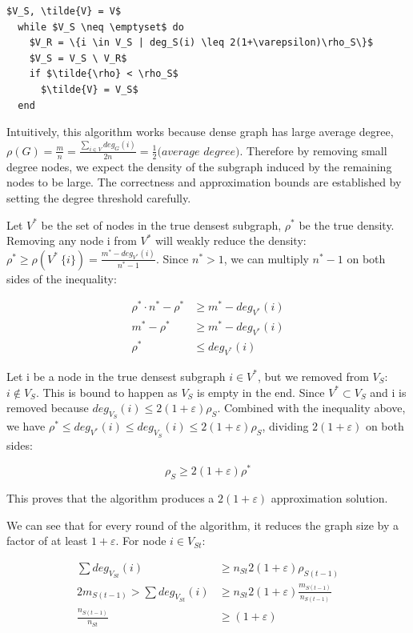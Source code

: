 \documentclass{article}
\begin{document}
\begin{lstlisting}[mathescape=true]
  $V_S, \tilde{V} = V$
  while $V_S \neq \emptyset$ do
    $V_R = \{i \in V_S | deg_S(i) \leq 2(1+\varepsilon)\rho_S\}$
    $V_S = V_S \ V_R$
    if $\tilde{\rho} < \rho_S$
      $\tilde{V} = V_S$
  end
\end{lstlisting}

Intuitively, this algorithm works because dense graph has large average degree, $\rho(G) = \frac{m}{n} = \frac{\sum_{i \in V}{deg_G(i)}}{2n} = \frac{1}{2} \textit{(average degree)}$. Therefore by removing small degree nodes, we expect the density of the subgraph induced by the remaining nodes to be large. The correctness and approximation bounds are established by setting the degree threshold carefully.

Let $V^*$ be the set of nodes in the true densest subgraph, $\rho^*$ be the true density. Removing any node i from $V^*$ will weakly reduce the density: $\rho^* \geq \rho(V^* \ \{i\}) = \frac{m^* - deg_{V^*}(i)}{n^* - 1}$. Since $n^* > 1$, we can multiply $n^* - 1$ on both sides of the inequality:

\begin{equation}
  \begin{split}
    \rho^* \cdot n^* - \rho^* & \geq m^* - deg_{V^*}(i) \\
    m^* - \rho^* & \geq m^* - deg_{V^*}(i) \\
    \rho^* & \leq deg_{V^*}(i)
  \end{split}
\end{equation}

Let i be a node in the true densest subgraph $ i \in V^*$, but we removed from $V_S$: $i \notin V_S$. This is bound to happen as $V_S$ is empty in the end. Since $V^* \subset V_S$ and i is removed because $deg_{V_S}(i) \leq 2(1+\varepsilon)\rho_S$. Combined with the inequality above, we have $\rho^* \leq deg_{V^*}(i) \leq deg_{V_S}(i) \leq 2(1+\varepsilon)\rho_S$, dividing $2(1+\varepsilon)$ on both sides:

\begin{equation}
  \rho_S \geq 2(1+\varepsilon) \rho^*
\end{equation}

This proves that the algorithm produces a $2(1+\varepsilon)$ approximation solution.

We can see that for every round of the algorithm, it reduces the graph size by a factor of at least $1+\varepsilon$. For node $i \in V_{St}$:

\begin{equation}
  \begin{split}
    \sum{deg_{V_{St}}(i)} & \geq n_{St} 2(1+\varepsilon)\rho_{S(t-1)} \\
    2 m_{S(t-1)} > \sum{deg_{V_{St}}(i)} & \geq n_{St} 2(1+\varepsilon) \frac{m_{S(t-1)}}{n_{S(t-1)}} \\
    \frac{n_{S(t-1)}}{n_{St}} & \geq (1+\varepsilon)
  \end{split}
\end{equation}
\end{document}
